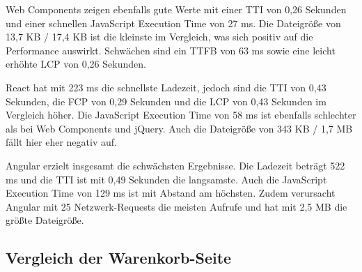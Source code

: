 \documentclass[oneside]{ausarbeitung}
\begin{document}
Web Components zeigen ebenfalls gute Werte mit einer TTI von 0,26 Sekunden und einer schnellen JavaScript Execution Time von 27 ms. Die Dateigröße von 13,7 KB / 17,4 KB ist die kleinste im Vergleich, was sich positiv auf die Performance auswirkt. Schwächen sind ein TTFB von 63 ms sowie eine leicht erhöhte LCP von 0,26 Sekunden.

React hat mit 223 ms die schnellste Ladezeit, jedoch sind die TTI von 0,43 Sekunden, die FCP von 0,29 Sekunden und die LCP von 0,43 Sekunden im Vergleich höher. Die JavaScript Execution Time von 58 ms ist ebenfalls schlechter als bei Web Components und jQuery. Auch die Dateigröße von 343 KB / 1,7 MB fällt hier eher negativ auf.

Angular erzielt insgesamt die schwächsten Ergebnisse. Die Ladezeit beträgt 522 ms und die TTI ist mit 0,49 Sekunden die langsamste. Auch die JavaScript Execution Time von 129 ms ist mit Abstand am höchsten. Zudem verursacht Angular mit 25 Netzwerk-Requests die meisten Aufrufe und hat mit 2,5 MB die größte Dateigröße.

\subsection{Vergleich der Warenkorb-Seite}
\end{document}
